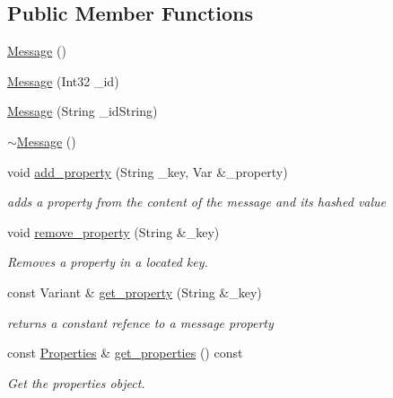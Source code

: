\subsection*{Public Member Functions}
\begin{DoxyCompactItemize}
\item 
\mbox{\hyperlink{classbanita_1_1_message_a24549655ea0b48a3a3f19cf3a40988cc}{Message}} ()
\item 
\mbox{\hyperlink{classbanita_1_1_message_a31f83b3410a80c1bc34c41d33faab5e6}{Message}} (Int32 \+\_\+id)
\item 
\mbox{\hyperlink{classbanita_1_1_message_ade7a1c60f22840e12613a3816e29f0f5}{Message}} (String \+\_\+id\+String)
\item 
\mbox{\hyperlink{classbanita_1_1_message_a18f6412c3a331b29e003c9f7b85e9aa7}{$\sim$\+Message}} ()
\item 
void \mbox{\hyperlink{classbanita_1_1_message_a70400180d77ac6461296cd634b5f102a}{add\+\_\+property}} (String \+\_\+key, Var \&\+\_\+property)
\begin{DoxyCompactList}\small\item\em adds a property from the content of the message and it\textquotesingle{}s hashed value \end{DoxyCompactList}\item 
void \mbox{\hyperlink{classbanita_1_1_message_af38e2a1b0ab69d111ba296f549665e13}{remove\+\_\+property}} (String \&\+\_\+key)
\begin{DoxyCompactList}\small\item\em Removes a property in a located key. \end{DoxyCompactList}\item 
const Variant \& \mbox{\hyperlink{classbanita_1_1_message_ac05afd843e1c6cee7965bdc90bcce84f}{get\+\_\+property}} (String \&\+\_\+key)
\begin{DoxyCompactList}\small\item\em returns a constant refence to a message property \end{DoxyCompactList}\item 
const \mbox{\hyperlink{classbanita_1_1_message_ab38626a5034f095bf7d856e95ab89290}{Properties}} \& \mbox{\hyperlink{classbanita_1_1_message_a339b3ec9d64aeaeb726fa90d2a6162c3}{get\+\_\+properties}} () const
\begin{DoxyCompactList}\small\item\em Get the properties object. \end{DoxyCompactList}\item 

\end{DoxyCompactItemize}
